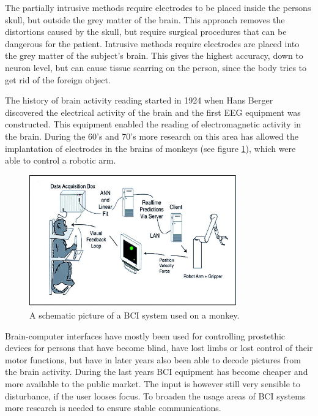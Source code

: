 The partially intrusive methods require electrodes to be placed inside the persons skull, but outside the grey matter of the brain. This approach removes the distortions caused by the skull, but require surgical procedures that can be dangerous for the patient. Intrusive methods require electrodes are placed into the grey matter of the subject's brain. This gives the highest accuracy, down to neuron level, but can cause tissue scarring on the person, since the body tries to get rid of the foreign object.

The history of brain activity reading started in 1924 when Hans Berger discovered the electrical activity of the brain and the first EEG equipment was constructed\cite{haas2003hans}. This equipment enabled the reading of electromagnetic activity in the brain. During the 60's and 70's more research on this area has allowed the implantation of electrodes in the brains of monkeys (see figure \ref{apa}), which were able to control a robotic arm\cite{GeorgopoulosLuritoPetridesEtAl89}\cite{lebedev2005cortical}. 

\begin{figure}[]
\includegraphics[width=0.8\textwidth] {bilder/apa.jpg}
\caption{A schematic picture of a BCI system used on a monkey.}
\label{apa}
\end{figure}
\nocite{apa}

Brain-computer interfaces have mostly been used for controlling prostethic devices for persons that have become blind, have lost limbs or lost control of their motor functions\cite{lebedev2006brain}, but have in later years also been able to decode pictures from the brain activity\cite{miyawaki2008visual}.
During the last years BCI equipment has become cheaper and more available to the public market\cite{legobrain}. The input is however still very sensible to disturbance, if the user looses focus. To broaden the usage areas of BCI systems more research is needed to ensure stable communications.

